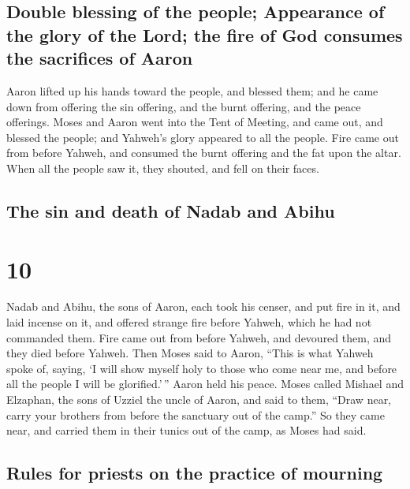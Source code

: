 \hypertarget{double-blessing-of-the-people-appearance-of-the-glory-of-the-lord-the-fire-of-god-consumes-the-sacrifices-of-aaron}{%
\subsection{Double blessing of the people; Appearance of the glory of
the Lord; the fire of God consumes the sacrifices of
Aaron}\label{double-blessing-of-the-people-appearance-of-the-glory-of-the-lord-the-fire-of-god-consumes-the-sacrifices-of-aaron}}

 Aaron lifted up his hands toward the people, and blessed
them; and he came down from offering the sin offering, and the burnt
offering, and the peace offerings.  Moses and Aaron went
into the Tent of Meeting, and came out, and blessed the people; and
Yahweh's glory appeared to all the people.  Fire came out
from before Yahweh, and consumed the burnt offering and the fat upon the
altar. When all the people saw it, they shouted, and fell on their
faces.

\hypertarget{the-sin-and-death-of-nadab-and-abihu}{%
\subsection{The sin and death of Nadab and
Abihu}\label{the-sin-and-death-of-nadab-and-abihu}}

\hypertarget{section-9}{%
\section{10}\label{section-9}}

 Nadab and Abihu, the sons of Aaron, each took his censer,
and put fire in it, and laid incense on it, and offered strange fire
before Yahweh, which he had not commanded them.  Fire came
out from before Yahweh, and devoured them, and they died before Yahweh.
 Then Moses said to Aaron, ``This is what Yahweh spoke of,
saying, `I will show myself holy to those who come near me, and before
all the people I will be glorified.'\,'' Aaron held his peace.
 Moses called Mishael and Elzaphan, the sons of Uzziel the
uncle of Aaron, and said to them, ``Draw near, carry your brothers from
before the sanctuary out of the camp.''  So they came
near, and carried them in their tunics out of the camp, as Moses had
said.

\hypertarget{rules-for-priests-on-the-practice-of-mourning}{%
\subsection{Rules for priests on the practice of
mourning}\label{rules-for-priests-on-the-practice-of-mourning}}

